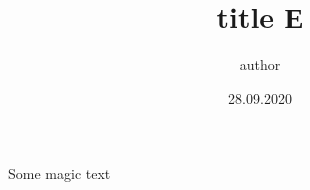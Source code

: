 \documentclass[UTF-8,a4paper]{article}
\begin{document}
\title{title Е }
\author{author}
\date{28.09.2020}

\maketitle

Some magic
text
\end{document}
